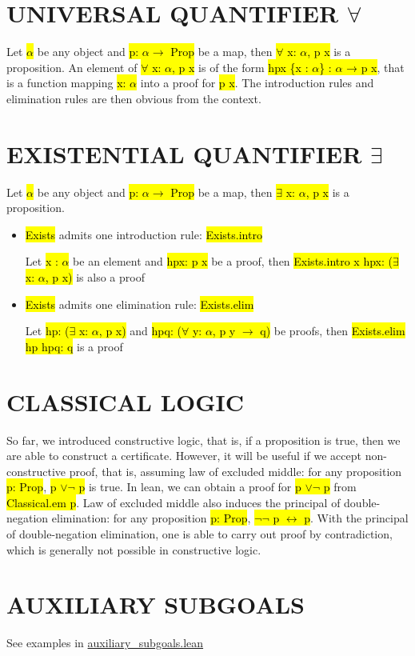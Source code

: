 \section{UNIVERSAL QUANTIFIER $\forall$}

Let \hl{$\alpha$} be any object and \hl{p: $\alpha \to$ Prop} be a map, then \hl{$\forall$ x: $\alpha$, p x} is a proposition. An element of \hl{$\forall$ x: $\alpha$, p x} is of the form \hl{hpx \{x : $\alpha$\} : $\alpha$ → p x}, that is a function mapping \hl{x: $\alpha$} into a proof for \hl{p x}. The introduction rules and elimination rules are then obvious from the context.

\section{EXISTENTIAL QUANTIFIER $\exists$}

Let \hl{$\alpha$} be any object and \hl{p: $\alpha \to$ Prop} be a map, then \hl{$\exists$ x: $\alpha$, p x} is a proposition.

\begin{itemize}
	\item \hl{Exists} admits one introduction rule: \hl{Exists.intro}
	
	Let \hl{x : $\alpha$} be an element and \hl{hpx: p x} be a proof, then \hl{Exists.intro x hpx: ($\exists$ x: $\alpha$, p x)} is also a proof
	
	\item \hl{Exists} admits one elimination rule: \hl{Exists.elim}
	
	Let \hl{hp: ($\exists$ x: $\alpha$, p x)} and \hl{hpq: ($\forall$ y: $\alpha$, p y $\to$ q)} be proofs, then \hl{Exists.elim hp hpq: q} is a proof 
\end{itemize}

\section{CLASSICAL LOGIC}

So far, we introduced constructive logic, that is, if a proposition is true, then we are able to construct a certificate. However, it will be useful if we accept non-constructive proof, that is, assuming law of excluded middle: for any proposition \hl{p: Prop}, \hl{p $\lor \lnot$ p} is true. In lean, we can obtain a proof for \hl{p $\lor \lnot$ p} from \hl{Classical.em p}. Law of excluded middle also induces the principal of double-negation elimination: for any proposition \hl{p: Prop}, \hl{$\lnot \lnot$ p $\leftrightarrow$ p}. With the principal of double-negation elimination, one is able to carry out proof by contradiction, which is generally not possible in constructive logic. 

\section{AUXILIARY SUBGOALS}

See examples in \href{../theorem_proving_in_lean_4/theorem_proving/auxiliary_subgoals.lean}{auxiliary\_subgoals.lean}







